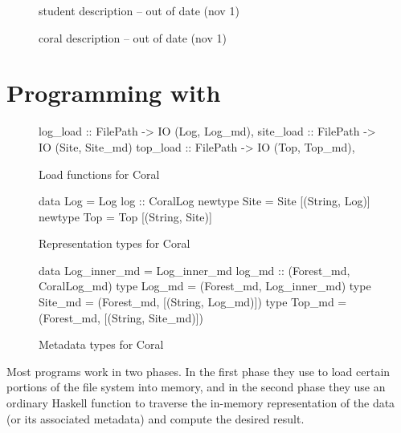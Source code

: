 \documentclass[nocopyrightspace,natbib]{sigplanconf}
\begin{document}
\begin{figure}

\caption{\forest{} student description -- out of date (nov 1)}
\label{fig:student-description}
\end{figure}

\begin{figure}

\caption{\forest{} coral description -- out of date (nov 1)}
\label{fig:coral-description}
\end{figure}

\section{Programming with \forest{}}
\label{sec:exp}

\begin{figure}
\begin{code}
log_load :: FilePath -> IO (Log, Log_md),
site_load :: FilePath -> IO (Site, Site_md)
top_load :: FilePath -> IO (Top, Top_md),
\end{code}
\caption{Load functions for Coral}
\label{fig:coral-load}
\end{figure}

\begin{figure}
\begin{code}
data Log = Log { log :: CoralLog }
newtype Site = Site [(String, Log)]
newtype Top = Top [(String, Site)]
\end{code}
\caption{Representation types for Coral}
\label{fig:coral-rep}
\end{figure}

\begin{figure}
\begin{code}
data Log_inner_md = 
  Log_inner_md { log_md :: (Forest_md, CoralLog_md) }
type Log_md = (Forest_md, Log_inner_md)
type Site_md = (Forest_md, [(String, Log_md)])
type Top_md = (Forest_md, [(String, Site_md)])
\end{code}
\caption{Metadata types for Coral}
\label{fig:coral-md}
\end{figure}



Most \forest{} programs work in two phases. In the first phase they
use \forest{} to load certain portions of the file system into memory,
and in the second phase they use an ordinary Haskell function to
traverse the in-memory representation of the data (or its associated
metadata) and compute the desired result.
\end{document}
